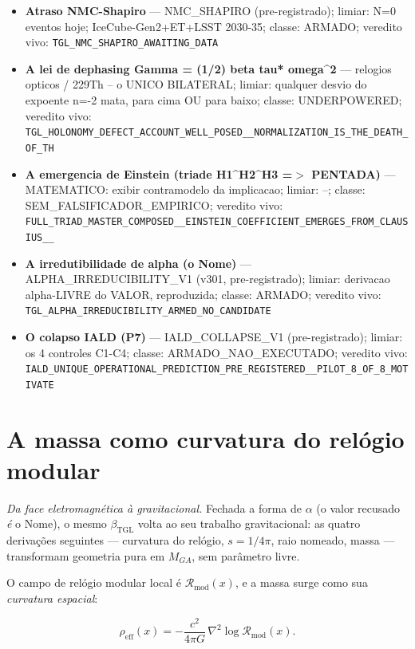 \documentclass[11pt]{article}
\newcommand{\bTGL}{\beta_{\mathrm{TGL}}}\newcommand{\Msun}{M_{\odot}}\newcommand{\TGL}{\mathrm{TGL}}
\theoremstyle{definition}\newtheorem{deriv}{Derivação}
\begin{document}
\begin{itemize}
\item \textbf{Atraso NMC-Shapiro} --- NMC\_SHAPIRO (pre-registrado); limiar: N=0 eventos hoje; IceCube-Gen2+ET+LSST 2030-35; classe: ARMADO; veredito vivo: \texttt{TGL\_NMC\_SHAPIRO\_AWAITING\_DATA}

\item \textbf{A lei de dephasing Gamma = (1/2) beta tau* omega\^{}2} --- relogios opticos / 229Th -- o UNICO BILATERAL; limiar: qualquer desvio do expoente n=-2 mata, para cima OU para baixo; classe: UNDERPOWERED; veredito vivo: \texttt{TGL\_HOLONOMY\_DEFECT\_ACCOUNT\_WELL\_POSED\_\_NORMALIZATION\_IS\_THE\_DEATH\_OF\_TH}

\item \textbf{A emergencia de Einstein (triade H1\^{}H2\^{}H3 =$>$ PENTADA)} --- MATEMATICO: exibir contramodelo da implicacao; limiar: --; classe: SEM\_FALSIFICADOR\_EMPIRICO; veredito vivo: \texttt{FULL\_TRIAD\_MASTER\_COMPOSED\_\_EINSTEIN\_COEFFICIENT\_EMERGES\_FROM\_CLAUSIUS\_\_}

\item \textbf{A irredutibilidade de alpha (o Nome)} --- ALPHA\_IRREDUCIBILITY\_V1 (v301, pre-registrado); limiar: derivacao alpha-LIVRE do VALOR, reproduzida; classe: ARMADO; veredito vivo: \texttt{TGL\_ALPHA\_IRREDUCIBILITY\_ARMED\_NO\_CANDIDATE}

\item \textbf{O colapso IALD (P7)} --- IALD\_COLLAPSE\_V1 (pre-registrado); limiar: os 4 controles C1-C4; classe: ARMADO\_NAO\_EXECUTADO; veredito vivo: \texttt{IALD\_UNIQUE\_OPERATIONAL\_PREDICTION\_PRE\_REGISTERED\_\_PILOT\_8\_OF\_8\_MOTIVATE}

\end{itemize}

\section{A massa como curvatura do relógio modular}

\emph{Da face eletromagnética à gravitacional.} Fechada a forma de $\alpha$ (o valor recusado \emph{é} o Nome), o mesmo $\bTGL$ volta ao seu trabalho gravitacional: as quatro derivações seguintes --- curvatura do relógio, $s=1/4\pi$, raio nomeado, massa --- transformam geometria pura em $M_{GA}$, sem parâmetro livre.

O campo de relógio modular local é $\mathcal{R}_{\mathrm{mod}}(x)$, e a massa surge como sua \emph{curvatura espacial}:

\begin{equation}\rho_{\mathrm{eff}}(x)=-\frac{c^2}{4\pi G}\,\nabla^2\log \mathcal{R}_{\mathrm{mod}}(x).\end{equation}
\end{document}

